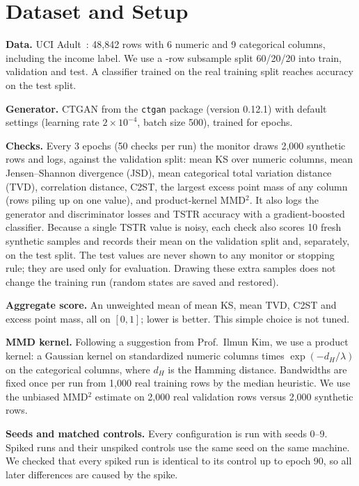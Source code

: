 \documentclass[conference]{IEEEtran}
\begin{document}
\section{Dataset and Setup}
\textbf{Data.} UCI Adult~\cite{becker1996adult}: 48,842 rows with 6 numeric
and 9 categorical columns, including the income label. We use a
\nRows-row subsample split 60/20/20 into train, validation and test. A
classifier trained on the real training split reaches \realTSTR{} accuracy on
the test split.

\textbf{Generator.} CTGAN from the \texttt{ctgan} package (version 0.12.1)
with default settings (learning rate $2\times10^{-4}$, batch size 500),
trained for \nEpochs{} epochs.

\textbf{Checks.} Every 3 epochs (50 checks per run) the monitor draws 2,000
synthetic rows and logs, against the validation split: mean KS over numeric
columns, mean Jensen--Shannon divergence (JSD), mean categorical total
variation distance (TVD), correlation distance, C2ST, the largest excess
point mass of any column (rows piling up on one value), and product-kernel
MMD$^2$. It also logs the generator and discriminator losses and TSTR
accuracy with a gradient-boosted classifier. Because a single TSTR value is
noisy, each check also scores 10 fresh synthetic samples and records their
mean on the validation split and, separately, on the test split. The test
values are never shown to any monitor or stopping rule; they are used only
for evaluation. Drawing these extra samples does not change the training run
(random states are saved and restored).

\textbf{Aggregate score.} An unweighted mean of mean KS, mean TVD, C2ST and
excess point mass, all on $[0,1]$; lower is better. This simple choice is
not tuned.

\textbf{MMD kernel.} Following a suggestion from Prof.\ Ilmun Kim, we use a
product kernel: a Gaussian kernel on standardized numeric columns times
$\exp(-d_H/\lambda)$ on the categorical columns, where $d_H$ is the Hamming
distance. Bandwidths are fixed once per run from 1,000 real training rows by
the median heuristic. We use the unbiased MMD$^2$ estimate on 2,000 real
validation rows versus 2,000 synthetic rows.

\textbf{Seeds and matched controls.} Every configuration is run with seeds
0--9. Spiked runs and their unspiked controls use the same seed on the same
machine. We checked that every spiked run is identical to its control up to
epoch 90, so all later differences are caused by the spike.
\end{document}
